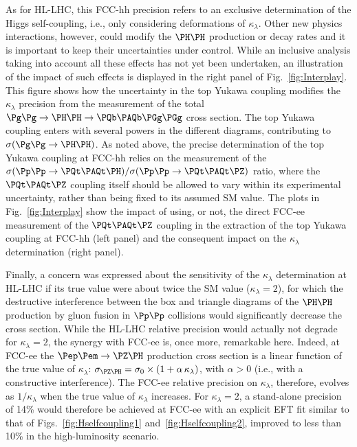 As for HL-LHC, this FCC-hh precision refers to an exclusive determination of the Higgs self-coupling, 
i.e., only considering deformations of $\kappa_\lambda$. 
Other new physics interactions, however, could modify the $\PH\PH$ production or decay rates and it is important to keep their uncertainties under control. 
While an inclusive analysis taking into account all these effects has not yet been undertaken, 
an illustration of the impact of such effects is displayed in the right panel of Fig.~\ref{fig:Interplay}. 
This figure shows how the uncertainty in the top Yukawa coupling modifies the $\kappa_\lambda$ precision 
from the measurement of the total $\Pg\Pg \to \PH\PH \to \PQb\PAQb \PGg\PGg$ cross section. 
The top Yukawa coupling enters with several powers in the different diagrams, contributing to $\sigma(\Pg\Pg \to \PH\PH)$. 
As noted above, the precise determination of the top Yukawa coupling at FCC-hh relies 
on the measurement of the $\sigma(\Pp\Pp \to \ttbar\PH)/\sigma(\Pp\Pp \to \ttbar\PZ)$ ratio, 
where the $\ttbar\PZ$ coupling itself should be allowed to vary within its experimental uncertainty, 
rather than being fixed to its assumed SM value. 
The plots in Fig.~\ref{fig:Interplay} show the impact of using, or not, the direct FCC-ee measurement of the $\ttbar\PZ$ coupling 
in the extraction of the top Yukawa coupling at FCC-hh (left panel) and the consequent impact on the $\kappa_\lambda$ determination (right panel). 

Finally, a concern was expressed 
about the sensitivity of the $\kappa_\lambda$ determination at HL-LHC if its true value were about twice the SM value ($\kappa_\lambda = 2$), 
for which the destructive interference between the box and triangle diagrams of the $\PH\PH$ production by gluon fusion in $\Pp\Pp$ collisions 
would significantly decrease the cross section. 
While the HL-LHC relative precision would actually not degrade for $\kappa_\lambda = 2$, the synergy with FCC-ee is, once more, remarkable here. 
Indeed, at FCC-ee the $\epem \to \PZ\PH$ production cross section is a linear function of the true value of $\kappa_\lambda$: 
$\sigma_{\PZ\PH} = \sigma_0 \times (1 + \alpha \, \kappa_\lambda)$, with $\alpha > 0$ (i.e., with a constructive interference). 
The FCC-ee relative precision on $\kappa_\lambda$, therefore, evolves as $1/\kappa_\lambda$ when the true value of $\kappa_\lambda$ increases. 
For $\kappa_\lambda = 2$, a stand-alone precision of 14\% would therefore be achieved at FCC-ee 
with an explicit EFT fit similar to that of Figs.~\ref{fig:Hselfcoupling1} and~\ref{fig:Hselfcoupling2}, 
improved to less than 10\% in the high-luminosity scenario.


